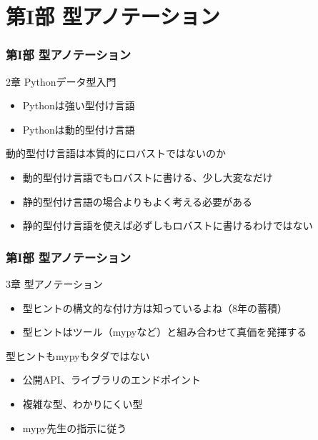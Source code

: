 \documentclass[aspectratio=169,dvipdfmx,14pt,notheorems]{beamer}
\theoremstyle{definition}
\begin{document}
\section{第I部 型アノテーション}

\begin{frame}\frametitle{第I部 型アノテーション}

\begin{block}{2章 Pythonデータ型入門}
\begin{itemize}
\item Pythonは強い型付け言語
\item Pythonは動的型付け言語
\end{itemize}

\end{block}

\begin{alertblock}{動的型付け言語は本質的にロバストではないのか}
\begin{itemize}
\item 動的型付け言語でもロバストに書ける、少し大変なだけ
\item 静的型付け言語の場合よりもよく考える必要がある
\item 静的型付け言語を使えば必ずしもロバストに書けるわけではない
\end{itemize}
\end{alertblock}

\end{frame}

\begin{frame}\frametitle{第I部 型アノテーション}

\begin{block}{3章 型アノテーション}
\begin{itemize}
\item 型ヒントの構文的な付け方は知っているよね（8年の蓄積）
\item 型ヒントはツール（mypyなど）と組み合わせて真価を発揮する
\end{itemize}

\end{block}

\begin{alertblock}{型ヒントもmypyもタダではない}
\begin{itemize}
\item 公開API、ライブラリのエンドポイント
\item 複雑な型、わかりにくい型
\item mypy先生の指示に従う
\end{itemize}
\end{alertblock}

\end{frame}
\end{document}
